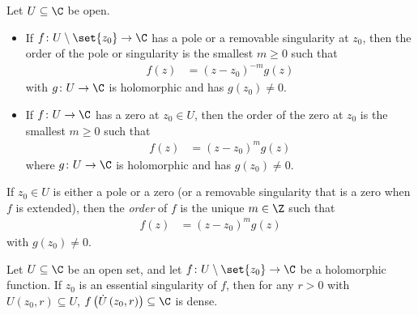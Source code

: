 \documentclass[10pt]{mypackage}
\begin{document}
\begin{definition}
  Let $U\subseteq \C$ be open.
  \begin{itemize}
    \item If $f\colon U\setminus \set{z_0}\rightarrow \C$ has a pole or a removable singularity at $z_0$, then the order of the pole or singularity is the smallest $m \geq 0$ such that
      \begin{align*}
        f(z) &= \left( z-z_0 \right)^{-m} g(z)
      \end{align*}
      with $g\colon U\rightarrow \C$ is holomorphic and has $g\left( z_0 \right) \neq 0$.
    \item If $f\colon U\rightarrow \C$ has a zero at $z_0\in U$, then the order of the zero at $z_0$ is the smallest $m \geq 0$ such that
      \begin{align*}
        f(z) &= \left( z-z_0 \right)^{m}g(z)
      \end{align*}
      where $g\colon U\rightarrow \C$ is holomorphic and has $g\left( z_0 \right) \neq 0$.
  \end{itemize}
  If $z_0\in U$ is either a pole or a zero (or a removable singularity that is a zero when $f$ is extended), then the \textit{order} of $f$ is the unique $m\in\Z$ such that
  \begin{align*}
    f(z)  &= \left( z-z_0 \right)^{m}g(z)
  \end{align*}
  with $g\left(z_0\right)\neq 0$.
\end{definition}
\begin{theorem}
  Let $U\subseteq \C$ be an open set, and let $f\colon U\setminus \set{z_0}\rightarrow \C$ be a holomorphic function. If $z_0$ is an essential singularity of $f$, then for any $r > 0$ with $U\left( z_0,r \right)\subseteq U$, $f\left( \dot{U}\left( z_0,r \right) \right)\subseteq \C$ is dense.
\end{theorem}
\end{document}
